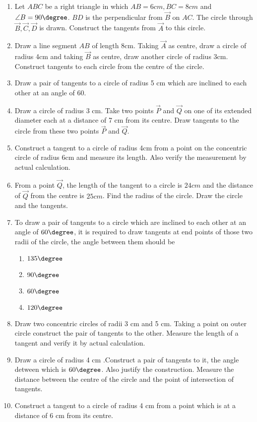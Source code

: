 \begin{enumerate}[label=\thesubsection.\arabic*,ref=\thesubsection.\theenumi]
\item 
\label{chapters/10/11/2/6}
Let $ABC$ be a right triangle in which $AB = 6 cm, BC = 8 cm$ and $\angle B = 90\degree$. $BD$ is the perpendicular from $\vec{B}$ on $AC$. The circle through $\vec{B}, \vec{C}, \vec{D}$ is drawn. Construct the tangents from $\vec{A}$ to this circle.
\item 
	Draw a line segment $AB$ of length 8cm. Taking $\vec{A}$ as centre, draw a circle of radius 4cm and taking $\vec{B}$ as centre, draw another circle of radius 3cm. Construct tangents to each circle from the centre of the circle.
\label{chapters/10/11/2/5}
\item 
	Draw a pair of tangents to a circle of radius 5 cm which are inclined to each other at an angle of 60\degree.
\label{chapters/10/11/2/4}
\item 
Draw a circle of radius 3 cm. Take two points $\vec{P}$ and $\vec{Q}$ on one of its extended diameter each at a distance of 7 cm from its centre. Draw tangents to the circle from these two points $\vec{P}$ and $\vec{Q}$.
\label{chapters/10/11/2/3}
\item 
	Construct a tangent to a circle of radius 4cm from a point on the concentric circle of radius 6cm and measure its length. Also verify the measurement by actual calculation.
\label{chapters/10/11/2/2}
\item From a point $\vec{Q}$, the length of the tangent to a circle is $24 cm$ and the distance of $\vec{Q}$ from the centre is $25 cm$. Find the radius of the circle. Draw the circle and the tangents. 
\label{chapters/10/10/2/1}
\item To draw a pair of tangents to a circle which are inclined to each other at an angle of $60\degree$, it is required
to draw tangents at end points of those two radii of the circle, the angle between them should be 
\begin{enumerate}
\item $135\degree$
\item $90\degree$
\item $60\degree$
\item $120\degree$ 
\end{enumerate}
\item Draw two concentric circles of radii 3 cm and 5 cm. Taking a point on outer circle construct the pair of tangents to the other. Measure the length of a tangent and verify it by actual calculation.
\item Draw a circle of radius 4 cm .Construct a pair of tangents to it, the angle detween which is $60\degree$. Also justify the construction. Measure the distance between the centre of the circle and the point of intersection of tangents.
\item Construct a tangent to a circle of radius 4 cm from a point which is at a distance of 6 cm from its centre.
\end{enumerate}
